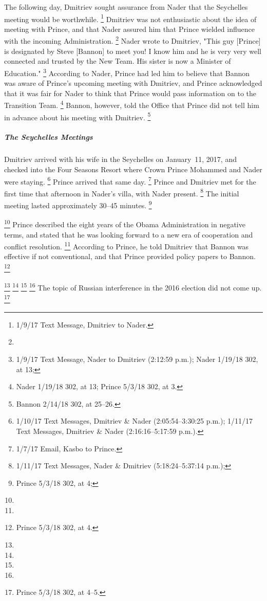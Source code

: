 The following day, Dmitriev sought assurance from Nader that the Seychelles meeting would be worthwhile.%
\footnote{1/9/17 Text Message, Dmitriev to Nader.}
Dmitriev was not enthusiastic about the idea of meeting with Prince, and that Nader assured him that Prince wielded influence with the incoming Administration.%
\footnote{}
Nader wrote to Dmitriev, "This guy [Prince] is designated by Steve [Bannon] to meet you!
I know him and he is very very well connected and trusted by the New Team.
His sister is now a Minister of Education."%
\footnote{1/9/17 Text Message, Nader to Dmitriev (2:12:59 p.m.);
Nader 1/19/18 302, at 13;
}
According to Nader, Prince had led him to believe that Bannon was aware of Prince's upcoming meeting with Dmitriev, and Prince acknowledged that it was fair for Nader to think that Prince would pass information on to the Transition Team.%
\footnote{Nader 1/19/18 302, at 13;  Prince 5/3/18 302, at 3.}
Bannon, however, told the Office that Prince did not tell him in advance about his meeting with Dmitriev.%
\footnote{Bannon 2/14/18 302, at 25--26.}

\subparagraph{The Seychelles Meetings}

Dmitriev arrived with his wife in the Seychelles on January~11, 2017, and checked into the Four Seasons Resort where Crown Prince Mohammed and Nader were staying.%
\footnote{1/10/17 Text Messages, Dmitriev \& Nader (2:05:54--3:30:25 p.m.);
1/11/17 Text Messages, Dmitriev \& Nader (2:16:16--5:17:59 p.m.).}
Prince arrived that same day.%
\footnote{1/7/17 Email, Kasbo to Prince.}
Prince and Dmitriev met for the first time that afternoon in Nader's villa, with Nader present.%
\footnote{1/11/17 Text Messages, Nader \& Dmitriev (5:18:24--5:37:14 p.m.);
}
The initial meeting lasted approximately 30--45 minutes.%
\footnote{Prince 5/3/18 302, at 4; }

\footnote{}
Prince described the eight years of the Obama Administration in negative terms, and stated that he was looking forward to a new era of cooperation and conflict resolution.%
\footnote{}
According to Prince, he told Dmitriev that Bannon was effective if not conventional, and that Prince provided policy papers to Bannon.%
\footnote{Prince 5/3/18 302, at 4.}

\footnote{}
\footnote{}
\footnote{}
\footnote{}
The topic of Russian interference in the 2016 election did not come up.%
\footnote{Prince 5/3/18 302, at 4--5.}

